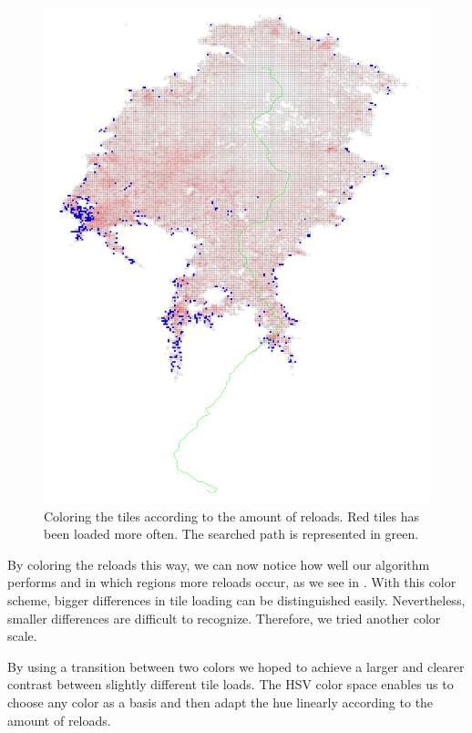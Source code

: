 \documentclass
[
    paper = a4,
    pagesize,
    12 pt,
    twoside,                       %
    open = right,
    DIV = calc,
    BCOR = 0 mm,                   %
    bibtotoc
]
{scrbook}
\begin{document}
\begin{figure}
    \includegraphics[width=\textwidth]{Images/vis-rgb-cache.png}
\caption[]{Coloring the tiles according to the amount of reloads. Red tiles has been loaded more often. The searched path is represented in green.}
\label{fig:reload_coloring_white}
\end{figure}

By coloring the reloads this way, we can now notice how well our algorithm performs and in which regions more reloads occur, as we see in .
With this color scheme, bigger differences in tile loading can be distinguished easily.
Nevertheless, smaller differences are difficult to recognize.
Therefore, we tried another color scale.

By using a transition between two colors we hoped to achieve a larger and clearer contrast between slightly different tile loads.
The HSV color space enables us to choose any color as a basis and then adapt the hue linearly according to the amount of reloads.
\end{document}
